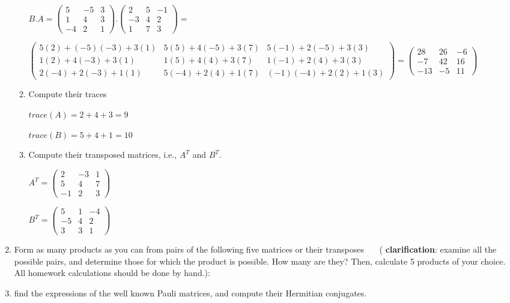 \documentclass[fleqn]{article}
\begin{document}
\begin{enumerate}
\begin{enumerate}
\noindent
$B.A=
\begin{pmatrix}
  5 & -5 & 3 \\
  1 & 4 & 3 \\
  -4 & 2 & 1
\end{pmatrix}
.
\begin{pmatrix}
  2 & 5 & -1 \\
  -3 & 4 & 2 \\
  1 & 7 & 3
\end{pmatrix}
=
$

$
\begin{pmatrix}
  5(2)+(-5)(-3)+3(1) & 5(5)+4(-5)+3(7) & 5(-1)+2(-5)+3(3) \\
  1(2)+4(-3)+3(1) & 1(5)+4(4)+3(7) & 1(-1)+2(4)+3(3) \\
  2(-4)+2(-3)+1(1) & 5(-4)+2(4)+1(7) & (-1)(-4)+2(2)+1(3)
\end{pmatrix}
=
\begin{pmatrix}
  28 & 26 & -6 \\
  -7 & 42 & 16 \\
  -13 & -5 & 11
\end{pmatrix}
$


\item  Compute their traces

$
trace(A)=2+4+3=9
$

$
trace(B)=5+4+1=10
$

\item  Compute their transposed matrices, i.e., $A^T$ and $B^T$. 

\noindent
$A^T=
\begin{pmatrix}
  2 & -3 & 1 \\
  5 & 4 & 7 \\
  -1 & 2 & 3
\end{pmatrix}
$

\noindent
$B^T=
\begin{pmatrix}
  5 & 1 & -4 \\
  -5 & 4 & 2 \\
  3 & 3 & 1
\end{pmatrix}
$

\end{enumerate}

\item Form as many products as you can from pairs of the following five matrices or their transposes ~~~( {\bf clarification}: examine all the possible pairs, and determine those for which the product is possible. How many are they?  Then, calculate 5 products of your choice. All homework calculations should be done by hand.): 


\item find the expressions of the well known Pauli matrices, and compute their Hermitian conjugates. 

\end{enumerate}
\end{document}
